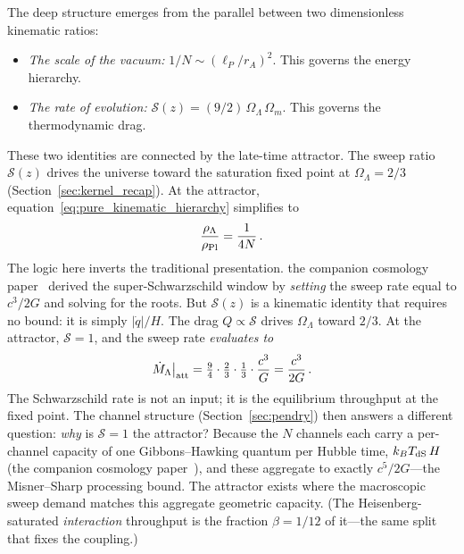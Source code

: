 \documentclass[aps,prd,twocolumn,10pt,superscriptaddress,nofootinbib]{revtex4-2}
\begin{document}
The deep structure emerges from the parallel between two
dimensionless kinematic ratios:
\begin{itemize}
\item \emph{The scale of the vacuum:}
  $1/N \sim (\ell_P/r_A)^2$.  This governs the energy hierarchy.
\item \emph{The rate of evolution:}
  $\mathcal{S}(z) = (9/2)\,\Omega_\Lambda\,\Omega_m$.  This
  governs the thermodynamic drag.
\end{itemize}
These two identities are connected by the late-time attractor.
The sweep ratio $\mathcal{S}(z)$ drives the universe toward the
saturation fixed point at $\Omega_\Lambda = 2/3$
(Section~\ref{sec:kernel_recap}).  At the attractor,
equation~\eqref{eq:pure_kinematic_hierarchy} simplifies to
\begin{equation}
\frac{\rho_\Lambda}{\rho_{\rm Pl}}
  = \frac{1}{4N}\,.
\label{eq:hierarchy_attractor}
\end{equation}
The logic here inverts the traditional presentation.
the companion cosmology paper~\cite{Sayegh2026} derived the super-Schwarzschild window
by \emph{setting} the sweep rate equal to $c^3/2G$ and solving
for the roots.  But $\mathcal{S}(z)$ is a kinematic identity that
requires no bound: it is simply $|\dot{q}|/H$.  The drag
$Q \propto \mathcal{S}$ drives $\Omega_\Lambda$ toward $2/3$.
At the attractor, $\mathcal{S} = 1$, and the sweep rate
\emph{evaluates to}
\begin{equation}
\dot{M}_\Lambda\big|_{\rm att}
  = \tfrac{9}{4}\cdot\tfrac{2}{3}\cdot\tfrac{1}{3}
    \cdot\frac{c^3}{G}
  = \frac{c^3}{2G}\,.
\label{eq:schwarzschild_emergent}
\end{equation}
The Schwarzschild rate is not an input; it is the equilibrium
throughput at the fixed point.  The channel structure
(Section~\ref{sec:pendry}) then answers a different question:
\emph{why} is $\mathcal{S} = 1$ the attractor?  Because the $N$
channels each carry a per-channel capacity of one Gibbons--Hawking
quantum per Hubble time, $k_B T_{\rm dS}\,H$
(the companion cosmology paper~\cite{Sayegh2026}), and these aggregate to exactly
$c^5/2G$---the Misner--Sharp processing bound.  The attractor
exists where the macroscopic sweep demand matches this aggregate
geometric capacity.  (The Heisenberg-saturated \emph{interaction}
throughput is the fraction $\beta = 1/12$ of it---the same split
that fixes the coupling.)
\end{document}
